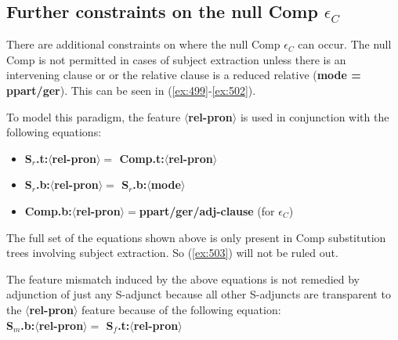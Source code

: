  
\subsection{Further constraints on the null Comp $\epsilon$$_{C}$} 
There are additional constraints on where the null Comp $\epsilon$$_{C}$ 
can occur. The null Comp is not permitted in cases of subject 
extraction unless there is an intervening clause or or 
the relative clause is a reduced relative ({\bf mode = ppart/ger}). 
This can be seen in (\ref{ex:499}-\ref{ex:502}). 
 
\beginsentences
{}\label{ex:499} 
\label{ex:500} 
\label{ex:501} 
\label{ex:502} 
\endsentences

 
To model this paradigm, the feature {\bf $\langle$rel-pron$\rangle$} is used in 
conjunction with the following equations: 
 
\begin{itemize} 
\item {\bf S$_{r}$.t:$\langle$rel-pron$\rangle =$ Comp.t:$\langle$rel-pron$\rangle$} 
\item {\bf S$_{r}$.b:$\langle$rel-pron$\rangle =$ S$_{r}$.b:$\langle$mode$\rangle$} 
\item {\bf Comp.b:$\langle$rel-pron$\rangle =$ppart/ger/adj-clause} 
(for $\epsilon$$_{C}$) 
\end{itemize} 
 
The full set of the equations shown above is only present in Comp 
substitution trees involving subject extraction. So (\ref{ex:503}) will 
not be ruled out. 
 
\beginsentences
{}\label{ex:503} 
\endsentences

 
The feature mismatch induced by the above equations 
is not remedied by adjunction of just any S-adjunct 
because all other S-adjuncts 
are transparent to the {\bf $\langle$rel-pron$\rangle$} feature 
because of the following equation:\\ 
{\bf S$_{m}$.b:$\langle$rel-pron$\rangle =$ S$_{f}$.t:$\langle$rel-pron$\rangle$} 
 
 

